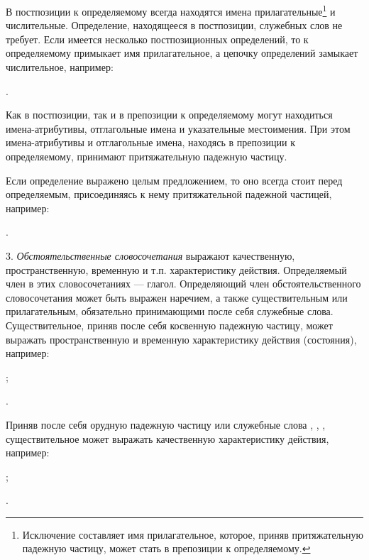 В постпозиции к определяемому всегда находятся имена прилагательные\footnote[52]{Исключение составляет имя прилагательное, которое, приняв притяжательную падежную частицу, может стать в препозиции к определяемому.} и числительные. Определение, находящееся в постпозиции, служебных слов не требует. Если имеется несколько постпозиционных определений, то к определяемому примыкает имя прилагательное, а цепочку определений замыкает числительное, например:
\begin{prfsample}
	\item {}.	
\end{prfsample}

Как в постпозиции, так и в препозиции к определяемому могут находиться имена-атрибутивы, отглагольные имена и указательные местоимения. При этом имена-атрибутивы и отглагольные имена, находясь в препозиции к определяемому, принимают притяжательную падежную частицу.

Если определение выражено целым предложением, то оно всегда стоит перед определяемым, присоединяясь к нему притяжательной падежной частицей, например:
\begin{prfsample}
	\item {}.
\end{prfsample}

3. \emph{Обстоятельственные словосочетания} выражают качественную, пространственную, временную и т.п. характеристику действия. Определяемый член в этих словосочетаниях --- глагол. Определяющий член обстоятельственного словосочетания может быть выражен наречием, а также существительным или прилагательным, обязательно принимающими после себя служебные слова. Существительное, приняв после себя косвенную падежную частицу, может выражать пространственную и временную характеристику действия (состояния), например:
\begin{prfsample}
	\item {};
	\item {}.
\end{prfsample}
Приняв после себя орудную падежную частицу или служебные слова , , , существительное может выражать качественную характеристику действия, например:
\begin{prfsample}
	\item {};
	\item {}.
\end{prfsample}


